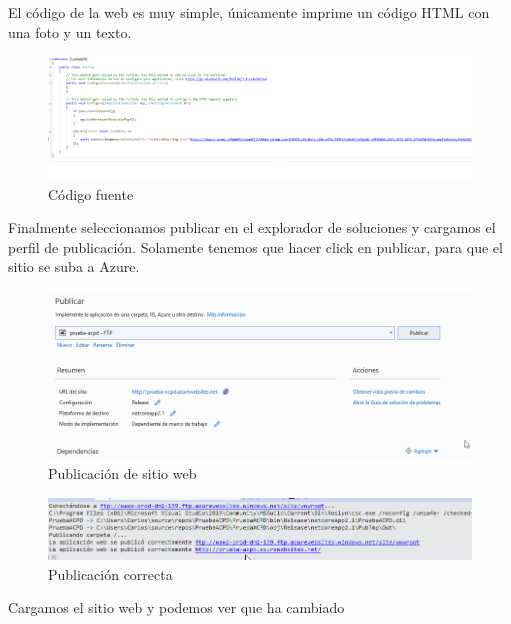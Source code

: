 El código de la web es muy simple, únicamente imprime un código HTML con una foto y un texto.

\begin{figure}[h]
	\centering
	\includegraphics[scale=0.3]{web_azure/web2.png}
	\caption{Código fuente}
	\label{AZWEB6}
\end{figure}

Finalmente seleccionamos publicar en el explorador de soluciones y cargamos el perfil de publicación. Solamente tenemos que hacer click en publicar, para que el sitio se suba a Azure.

\begin{figure}[h]
	\centering
	\includegraphics[scale=0.55]{web_azure/web3.png}
	\caption{Publicación de sitio web}
	\label{AZWE7}
\end{figure}

\newpage
\begin{figure}[h]
	\centering
	\includegraphics[scale=0.55]{web_azure/web4.png}
	\caption{Publicación correcta}
	\label{AZWEB8}
\end{figure}

Cargamos el sitio web y podemos ver que ha cambiado

